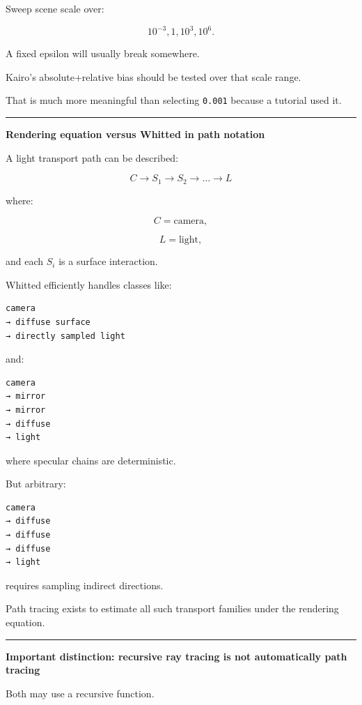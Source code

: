 Sweep scene scale over:

\[
10^{-3},
1,
10^3,
10^6.
\]

A fixed epsilon will usually break somewhere.

Kairo's absolute+relative bias should be tested over that scale range.

That is much more meaningful than selecting \texttt{0.001} because a tutorial used it.

\begin{center}\rule{0.5\linewidth}{0.5pt}\end{center}

\textbf{Rendering equation versus Whitted in path notation}

A light transport path can be described:

\[
C
\rightarrow
S_1
\rightarrow
S_2
\rightarrow
\dots
\rightarrow
L
\]

where:

\[
C=\text{camera},
\]

\[
L=\text{light},
\]

and each \(S_i\) is a surface interaction.

Whitted efficiently handles classes like:

\begin{verbatim}
camera
→ diffuse surface
→ directly sampled light
\end{verbatim}

and:

\begin{verbatim}
camera
→ mirror
→ mirror
→ diffuse
→ light
\end{verbatim}

where specular chains are deterministic.

But arbitrary:

\begin{verbatim}
camera
→ diffuse
→ diffuse
→ diffuse
→ light
\end{verbatim}

requires sampling indirect directions.

Path tracing exists to estimate all such transport families under the rendering equation.

\begin{center}\rule{0.5\linewidth}{0.5pt}\end{center}

\textbf{Important distinction: recursive ray tracing is not automatically path tracing}

Both may use a recursive function.

